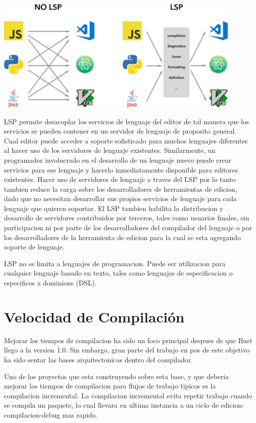 \documentclass[12pt, a4paper]{report}
\begin{document}
\noindent
\includegraphics[width=0.9\textwidth]{lsp}

LSP permite desacoplar los servicios de lenguaje del editor de tal manera que los servicios se pueden contener en un servidor de lenguaje de proposito general.
Cual editor puede acceder a soporte sofisticado para muchos lenguajes diferentes al hacer uso de los servidores de lenguaje existentes.
Similarmente, un programador involucrado en el desarrollo de un lenguaje nuevo puede crear servicios para ese lenguaje y hacerlo inmediatamente disponible para editores existentes.
Hacer uso de servidores de lenguaje a traves del LSP por lo tanto tambien reduce la carga sobre los desarrolladores de herramientas de edicion, dado que no necesitan desarrollar sus propios servicios de lenguaje para cada lenguaje que quieren soportar.
El LSP tambien habilita la distribucion y desarrollo de servidores contribuidos por terceros, tales como usuarios finales, sin participacion ni por parte de los desarrolladores del compilador del lenguaje o por los desarrolladores de la herramienta de edicion para la cual se esta agregando soporte de lenguaje.
\cite{language_server_protocol_wiki}

LSP no se limita a lenguajes de programacion.
Puede ser utilizacion para cualquier lenguaje basado en texto, tales como lenguajes de especificacion o especificos a dominions (DSL).
\cite{language_server_protocol_wiki}

\section*{Velocidad de Compilación}

Mejorar los tiempos de compilacion ha sido un foco principal despues de que Rust llego a la version 1.0.
Sin embargo, gran parte del trabajo en pos de este objetivo ha sido sentar las bases arquitectonicas dentro del compilador.

Uno de los proyectos que esta construyendo sobre esta base, y que deberia mejorar los tiempos de compilacion para flujos de trabajo tipicos es la compilacion incremental.
La compilacion incremental evita repetir trabajo cuando se compila un paquete, lo cual llevara en ultima instancia a un ciclo de edicion-compilacion-debug mas rapido.
\cite{rust_blog_incremental_compilation}
\end{document}
